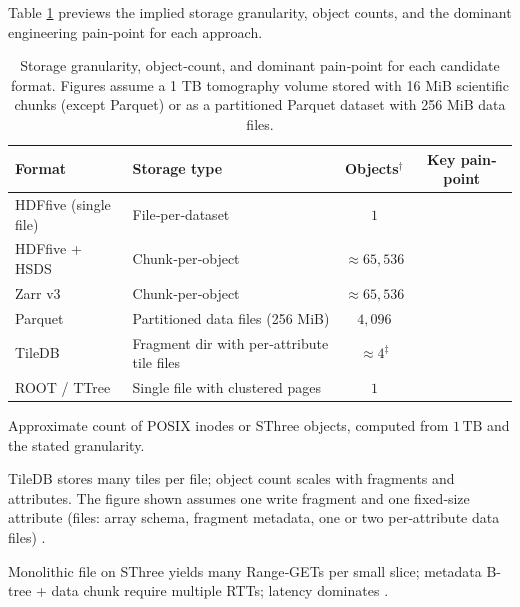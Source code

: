 \documentclass[nomenclature, english, bibtex]{kththesis}
\numberwithin{listing}{chapter}
\begin{document}
Table \ref{tab:format-granularity} previews the implied storage granularity, object counts, and the dominant engineering pain-point for each approach.


\begin{table}[htbp]
	  \centering
	  \begin{threeparttable}
	    \caption{Storage granularity, object‐count, and dominant pain‐point for each candidate format. Figures assume a 1 TB tomography volume stored with 16 MiB scientific chunks (except Parquet) or as a partitioned Parquet dataset with 256 MiB data files.}
	    \label{tab:format-granularity}
	    \footnotesize
	    \begin{tabularx}{\linewidth}{@{}l l c c@{}}
      \toprule
      \textbf{Format} & \textbf{Storage type} & \textbf{Objects$^\dagger$} & \textbf{Key pain‐point} \\
      \midrule
	      \gls{HDFfive} (single file)      & File‐per‐dataset                               & $1$                      & \tnote{a} \\
	      \gls{HDFfive} + \gls{HSDS}             & Chunk‐per‐object                               & $\approx 65{,}536$       & \tnote{b} \\
	      Zarr v3                 & Chunk‐per‐object                               & $\approx 65{,}536$       & \tnote{c} \\
	      Parquet                 & Partitioned data files (256 MiB)               & $4{,}096$                & \tnote{d} \\
	      TileDB                  & Fragment dir with per‐attribute tile files     & $\approx 4^\ddagger$     & \tnote{e} \\
	      \gls{ROOT} / \gls{TTree}          & Single file with clustered pages               & $1$                     & \tnote{f} \\
	      \bottomrule
	    \end{tabularx}
    \begin{tablenotes}[flushleft]\footnotesize
      \item[$\dagger$] Approximate count of \gls{POSIX} inodes or \gls{SThree} objects, computed from $1\,\mathrm{TB}$ and the stated granularity.
      \item[$\ddagger$] TileDB stores many tiles per file; object count scales with fragments and attributes. The figure shown assumes one write fragment and one fixed‐size attribute (files: array schema, fragment metadata, one or two per‐attribute data files) \cite{TileDBDataLayout}.
      \item[a] Monolithic file on \gls{SThree} yields many Range‐GETs per small slice; metadata B-tree + data chunk require multiple RTTs; latency dominates \cite{kang2020predicting}.

\end{tablenotes}
\end{threeparttable}
\end{table}
\end{document}
